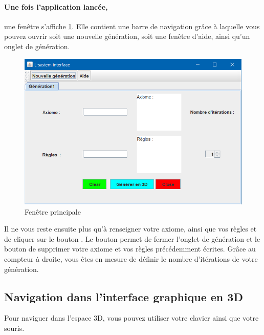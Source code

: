 \paragraph{Une fois l'application lancée,} une fenêtre s'affiche \ref{mainframe}. Elle contient une barre de navigation grâce à laquelle vous pouvez ouvrir soit une nouvelle génération, soit une fenêtre d'aide, ainsi qu'un onglet de génération.
\begin{figure}[h!]
    \centering
    \includegraphics[scale=0.5]{pics/MainFrameGUI.PNG}
    \caption{Fenêtre principale}
    \label{mainframe}
\end{figure}
Il ne vous reste ensuite plus qu'à renseigner votre axiome, ainsi que vos règles et de cliquer sur le bouton . Le bouton  permet de fermer l'onglet de génération et le bouton  de supprimer votre axiome et vos règles précédemment écrites. Grâce au compteur à droite, vous êtes en mesure de définir le nombre d'itérations de votre génération.


\subsection{Navigation dans l'interface graphique en 3D}
\label{sec:nav_3d}

Pour naviguer dans l'espace 3D, vous pouvez utiliser votre clavier ainsi que votre souris. 

